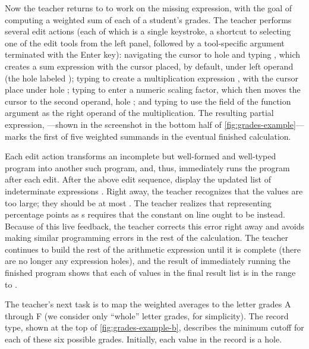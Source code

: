 Now the teacher returns to  to work on the missing
expression, with the goal of computing a weighted sum of each of a student's
grades.
%
The teacher performs several \Hazel{} edit actions (each of which is a single
keystroke, a shortcut to selecting one of the edit tools from the left panel,
followed by a tool-specific argument terminated with the Enter key):
%
navigating the cursor to hole  and typing \li{+}, which creates a
sum expression  with the cursor placed, by default, under
left operand (the hole labeled );
%
typing \li{*} to create a multiplication expression ,
with the cursor place under hole ;
%
typing  to enter a numeric scaling factor, which then moves
the cursor to the second operand, hole ; and
%
typing  to use the  field of the function argument
as the right operand of the multiplication.
%
The resulting partial expression, ---shown
in the screenshot in the bottom half of \autoref{fig:grades-example}---marks the
first of five weighted summands in the eventual finished 
calculation.

Each \Hazel{} edit action transforms an incomplete but well-formed and
well-typed program into another such program, and, thus, \Hazel{} immediately
runs the program after each edit.
%
After the above edit sequence, \Hazel{} display the updated list of
indeterminate expressions \li{[760.0 + ??_b.1, 880.0 + ??_b.2, ...]}.
%
Right away, the teacher recognizes that the values are too large; they should be
at most .
%
The teacher realizes that representing percentage points as s requires
that the constant on line  ought to be  instead.
%
Because of this live feedback, the teacher corrects this error right away and
avoids making similar programming errors in the rest of the calculation.
%
The teacher continues to build the rest of the arithmetic expression until it is
complete (there are no longer any expression holes), and the result of
immediately running the finished program shows that each of values in the final
result list is in the range  to .



%
The teacher's next task is to map the weighted averages to the letter grades A
through F (we consider only ``whole'' letter grades, for simplicity).
%
The  record type, shown at the top of
\autoref{fig:grades-example-b}, describes the minimum cutoff for each of
these six possible grades.
%
Initially, each value in the  record is a hole.

